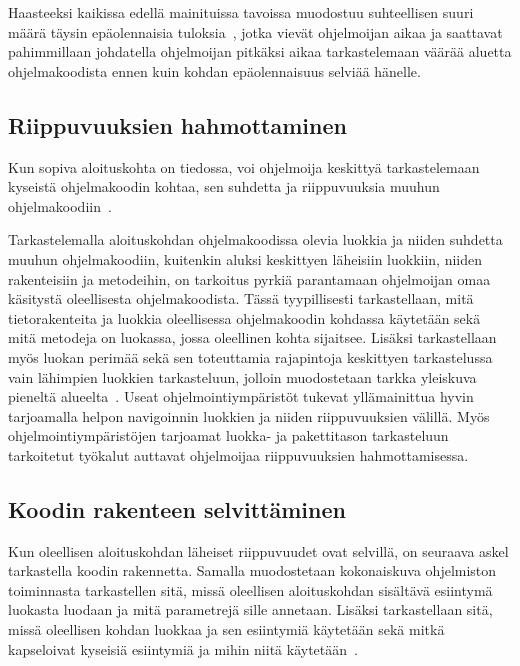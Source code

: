 \documentclass[finnish]{tktltiki2}
\theoremstyle{definition}
\theoremstyle{remark}
\begin{document}
Haasteeksi kaikissa edellä mainituissa tavoissa muodostuu suhteellisen suuri määrä täysin epäolennaisia tuloksia~\cite{eliciting-design-requirements-for-maintenance-oriented-ides}, jotka vievät ohjelmoijan aikaa ja saattavat pahimmillaan johdatella ohjelmoijan pitkäksi aikaa tarkastelemaan väärää aluetta ohjelmakoodista ennen kuin kohdan epäolennaisuus selviää hänelle.

\subsection{Riippuvuuksien hahmottaminen}
Kun sopiva aloituskohta on tiedossa, voi ohjelmoija keskittyä tarkastelemaan kyseistä ohjelmakoodin kohtaa, sen suhdetta ja riippuvuuksia muuhun ohjelmakoodiin~\cite{questions-during-software-evolution-tasks}.

Tarkastelemalla aloituskohdan ohjelmakoodissa olevia luokkia ja niiden suhdetta muuhun ohjelmakoodiin, kuitenkin aluksi keskittyen läheisiin luokkiin, niiden rakenteisiin ja metodeihin, on tarkoitus pyrkiä parantamaan ohjelmoijan omaa käsitystä oleellisesta ohjelmakoodista. Tässä tyypillisesti tarkastellaan, mitä tietorakenteita ja luokkia oleellisessa ohjelmakoodin kohdassa käytetään sekä mitä metodeja on luokassa, jossa oleellinen kohta sijaitsee. Lisäksi tarkastellaan myös luokan perimää sekä sen toteuttamia rajapintoja keskittyen tarkastelussa vain lähimpien luokkien tarkasteluun, jolloin muodostetaan tarkka yleiskuva pieneltä alueelta~\cite{questions-during-software-evolution-tasks,questions-during-software-evolution-tasks}.
Useat ohjelmointiympäristöt tukevat yllämainittua hyvin tarjoamalla helpon navigoinnin luokkien ja niiden riippuvuuksien välillä. Myös ohjelmointiympäristöjen tarjoamat luokka- ja pakettitason tarkasteluun tarkoitetut työkalut auttavat ohjelmoijaa riippuvuuksien hahmottamisessa.

\subsection{Koodin rakenteen selvittäminen}
Kun oleellisen aloituskohdan läheiset riippuvuudet ovat selvillä, on seuraava askel tarkastella koodin rakennetta. Samalla muodostetaan kokonaiskuva ohjelmiston toiminnasta tarkastellen sitä, missä oleellisen aloituskohdan sisältävä esiintymä luokasta luodaan ja mitä parametrejä sille annetaan. Lisäksi tarkastellaan sitä, missä oleellisen kohdan luokkaa ja sen esiintymiä käytetään sekä mitkä kapseloivat kyseisiä esiintymiä ja mihin niitä käytetään~\cite{questions-during-software-evolution-tasks}.
\end{document}
